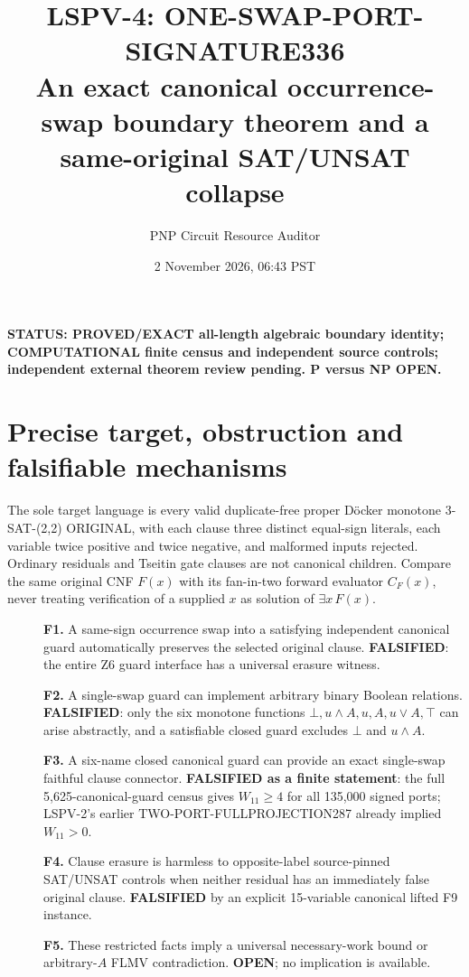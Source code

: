\documentclass[11pt]{article}
\title{LSPV-4: ONE-SWAP-PORT-SIGNATURE336\\An exact canonical occurrence-swap boundary theorem and a same-original SAT/UNSAT collapse}
\author{PNP Circuit Resource Auditor}
\date{2 November 2026, 06:43 PST}
\begin{document}
\maketitle
\noindent\textbf{STATUS: PROVED/EXACT all-length algebraic boundary identity; COMPUTATIONAL finite census and independent source controls; independent external theorem review pending. P versus NP OPEN.}

\section{Precise target, obstruction and falsifiable mechanisms}
The sole target language is every valid duplicate-free proper D\"ocker monotone 3-SAT-(2,2) ORIGINAL, with each clause three distinct equal-sign literals, each variable twice positive and twice negative, and malformed inputs rejected. Ordinary residuals and Tseitin gate clauses are not canonical children. Compare the same original CNF $F(x)$ with its fan-in-two forward evaluator $C_F(x)$, never treating verification of a supplied $x$ as solution of $\exists x\,F(x)$.
\begin{description}
\item[] \textbf{F1.} A same-sign occurrence swap into a satisfying independent canonical guard automatically preserves the selected original clause. \textbf{FALSIFIED}: the entire Z6 guard interface has a universal erasure witness.
\item[] \textbf{F2.} A single-swap guard can implement arbitrary binary Boolean relations. \textbf{FALSIFIED}: only the six monotone functions $\bot,u\land A,u,A,u\lor A,\top$ can arise abstractly, and a satisfiable closed guard excludes $\bot$ and $u\land A$.
\item[] \textbf{F3.} A six-name closed canonical guard can provide an exact single-swap faithful clause connector. \textbf{FALSIFIED as a finite statement}: the full 5,625-canonical-guard census gives $W_{11}\ge4$ for all 135,000 signed ports; LSPV-2's earlier TWO-PORT-FULLPROJECTION287 already implied $W_{11}>0$.
\item[] \textbf{F4.} Clause erasure is harmless to opposite-label source-pinned SAT/UNSAT controls when neither residual has an immediately false original clause. \textbf{FALSIFIED} by an explicit 15-variable canonical lifted F9 instance.
\item[] \textbf{F5.} These restricted facts imply a universal necessary-work bound or arbitrary-$A$ FLMV contradiction. \textbf{OPEN}; no implication is available.
\end{description}
\end{document}
